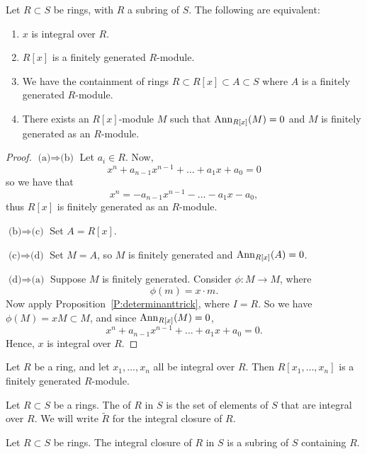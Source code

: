 \documentclass{ximera}
\begin{document}
\begin{proposition}
  Let $R\subset S$ be rings, with $R$ a subring of $S$. The following are equivalent:
  \begin{enumerate}
  \item $x$ is integral over $R$.
  \item $R[x]$ is a finitely generated $R$-module.
  \item We have the containment of rings $R\subset R[x] \subset
    A\subset S$ where $A$ is a finitely generated $R$-module.
  \item There exists an $R[x]$-module $M$ such that $\operatorname{Ann}_{R[x]}(M) =
    0$ and $M$ is finitely generated as an $R$-module.
  \end{enumerate}
  \begin{proof}
    $\text{(a)}\Rightarrow \text{(b)}$ Let $a_i\in R$. Now, 
    \[
    x^n + a_{n-1} x^{n-1} + \dots + a_1 x + a_0  = 0
    \]
    so we have that
    \[
    x^n = - a_{n-1} x^{n-1} - \dots - a_1 x - a_0,
    \] 
    thus $R[x]$ is finitely generated as an $R$-module.

    
    $\text{(b)}\Rightarrow \text{(c)}$ Set $A=R[x]$.


    $\text{(c)}\Rightarrow \text{(d)}$ Set $M=A$, so $M$ is finitely
    generated and $\operatorname{Ann}_{R[x]}(A)=0$.


    $\text{(d)}\Rightarrow \text{(a)}$ Suppose $M$ is finitely
    generated. Consider $\phi:M \to M$, where
    \[
    \phi(m) = x\cdot m.
    \]
    Now apply Proposition~\ref{P:determinanttrick}, where $I= R$. So
    we have $\phi(M) = xM \subset M$, and since $\operatorname{Ann}_{R[x]}(M) = 0$,
    \[
    x^n+ a_{n-1}x^{n-1} + \dots + a_1 x  + a_0 = 0.
    \]
    Hence, $x$ is integral over $R$.
  \end{proof}
\end{proposition}


\begin{corollary}
  Let $R$ be a ring, and let $x_1,\dots,x_n$ all be integral over
  $R$. Then $R[x_1,\dots,x_n]$ is a finitely generated $R$-module.
\end{corollary}

\begin{definition}
  Let $R\subset S$ be a rings. The  of $R$ in
  $S$ is the set of elements of $S$ that are integral over $R$.  We
  will write $\tilde{R}$ for the integral closure of
  $R$.
\end{definition}

\begin{corollary}
  Let $R\subset S$ be rings. The integral closure of $R$ in $S$ is a
  subring of $S$ containing $R$.
\end{corollary}
\end{document}
